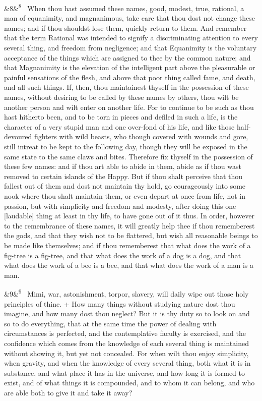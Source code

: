 \documentclass[12pt]{article}
\newcommand{\para}[1][]{\par\noindent\ifx&#1&\else\textsuperscript{\footnotesize #1}~\fi}
\begin{document}
\para[8] When thou hast assumed these names, good, modest, true, rational, a
man of equanimity, and magnanimous, take care that thou dost not change
these names; and if thou shouldst lose them, quickly return to them. And
remember that the term Rational was intended to signify a discriminating
attention to every several thing, and freedom from negligence; and that
Equanimity is the voluntary acceptance of the things which are assigned
to thee by the common nature; and that Magnanimity is the elevation of
the intelligent part above the pleasurable or painful sensations of the
flesh, and above that poor thing called fame, and death, and all such
things. If, then, thou maintainest thyself in the possession of these
names, without desiring to be called by these names by others, thou wilt
be another person and wilt enter on another life. For to continue to be
such as thou hast hitherto been, and to be torn in pieces and defiled in
such a life, is the character of a very stupid man and one over-fond of
his life, and like those half-devoured fighters with wild beasts, who
though covered with wounds and gore, still intreat to be kept to the
following day, though they will be exposed in the same state to the same
claws and bites. Therefore fix thyself in the possession of these few
names: and if thou art able to abide in them, abide as if thou wast
removed to certain islands of the Happy. But if thou shalt perceive
that thou fallest out of them and dost not maintain thy hold, go
courageously into some nook where thou shalt maintain them, or even
depart at once from life, not in passion, but with simplicity and
freedom and modesty, after doing this one [laudable] thing at least in
thy life, to have gone out of it thus. In order, however to the
remembrance of these names, it will greatly help thee if thou
rememberest the gods, and that they wish not to be flattered, but wish
all reasonable beings to be made like themselves; and if thou
rememberest that what does the work of a fig-tree is a fig-tree, and
that what does the work of a dog is a dog, and that what does the work
of a bee is a bee, and that what does the work of a man is a man.

\para[9] Mimi, war, astonishment, torpor, slavery, will daily wipe out
those holy principles of thine. + How many things without studying
nature dost thou imagine, and how many dost thou neglect? But it is
thy duty so to look on and so to do everything, that at the same time
the power of dealing with circumstances is perfected, and the
contemplative faculty is exercised, and the confidence which comes from
the knowledge of each several thing is maintained without showing it,
but yet not concealed. For when wilt thou enjoy simplicity, when
gravity, and when the knowledge of every several thing, both what it is
in substance, and what place it has in the universe, and how long it is
formed to exist, and of what things it is compounded, and to whom it can
belong, and who are able both to give it and take it away?
\end{document}
